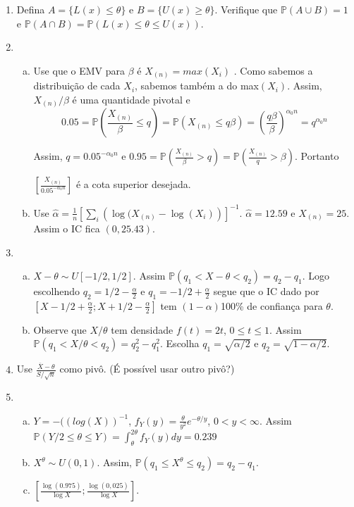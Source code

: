 \documentclass[10pt,brazil,addpoints]{exam}
\newcommand{\Prob}{\mathbb{P}}
\begin{document}
\begin{enumerate}[1.]
\medskip
\item Defina $A=\{L(x)\leq \theta\}$ e $B=\{U(x)\geq\theta\}$.
Verifique que $\Prob(A\cup B)=1$ e $\Prob(A\cap B)=\Prob(L(x)\leq\theta\leq U(x)).$ 

\medskip


\item 

\begin{enumerate}[a)]
\item %
Use que o EMV para $\beta$ é $X_{(n)}=max(X_i)$ . Como sabemos a distribuição de cada $X_i$, sabemos também a do max$(X_i)$. Assim, $X_{(n)}/\beta$ é uma quantidade pivotal e 
\[0.05=\Prob\left(\frac{X_{(n)}}{\beta}\leq q\right)
=\Prob\left(X_{(n)}\leq q\beta\right)=\left(\frac{q\beta}{\beta}\right)^{\alpha_0n}=q^{\alpha_0n}\] 

Assim, $q=0.05^{-\alpha_0n}$ e  $0.95=\Prob\left(\frac{X_{(n)}}{\beta}> q\right)=\Prob\left(\frac{X_{(n)}}{q}> \beta\right)$. Portanto 

$[\frac{X_{(n)}}{0.05^{-\alpha_0n}}]$ é a cota superior desejada.
\item Use $\hat{\alpha}=\frac{1}{n}\left[\sum_i\left( \log(X_{(n)}-\log(X_i)\right)\right]^{-1}$. $\hat{\alpha}= 12.59$ e  $X_{(n)} = 25$. Assim o IC fica $(0, 25.43)$.
\end{enumerate}

\medskip
\item 
\begin{enumerate}[a)]
\item  $X-\theta\sim U[-1/2,1/2]$. Assim $\Prob(q_1<X-\theta<q_2)=q_2-q_1$. Logo escolhendo $q_2=1/2-\frac{\alpha}{2}$ e $q_1=-1/2+\frac{\alpha}{2}$ segue que o IC dado por  $[X-1/2+\frac{\alpha}{2};X+1/2-\frac{\alpha}{2}]$ tem $(1-\alpha)$100\%  de confiança para $\theta$. 
\item Observe que $X/\theta$ tem densidade $f(t)=2t$, $0\leq t\leq 1$. Assim  $\Prob(q_1<X/\theta<q_2)=q_2^2-q_1^2$. Escolha $q_1=\sqrt{\alpha/2}$ e $q_2=\sqrt{1-\alpha/2}$.
\end{enumerate}


\medskip
\item
 Use $\frac{\overline{X}-\theta}{S/\sqrt{n}}$ como pivô. (É possível usar outro pivô?)


\medskip
\item
\begin{enumerate}[a)]
\item $Y=-((log(X))^{-1}$, $f_Y(y)=\frac{\theta}{y^2}e^{-\theta/y}$, $0<y<\infty$. Assim $\Prob(Y/2\leq \theta\leq Y)=\int_{\theta}^{2\theta}f_Y(y)dy=0.239$
\item $X^\theta \sim U(0,1)$. Assim, $\Prob(q_1\leq X^\theta\leq q_2)=q_2-q_1$. 
\item $\left[\frac{\log(0.975)}{\log X} ; \frac{\log(0,025)}{\log X}\right]$.
\end{enumerate}



\end{enumerate}
\end{document}
